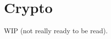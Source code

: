 \documentclass[pdftex,12pt,a4papaer,twoside,notitlepage]{report}
\begin{document}
\chapter{Crypto}

WIP (not really ready to be read).

% 
% 
% 
% 
% 
% 
\end{document}
